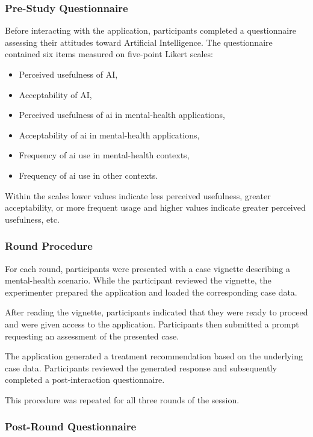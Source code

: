 \documentclass[sigconf,natbib=false]{acmart}
\begin{document}
\subsubsection{Pre-Study Questionnaire}

Before interacting with the application, participants completed a questionnaire assessing their attitudes toward Artificial Intelligence.
The questionnaire contained six items measured on five-point Likert scales:

\begin{itemize}
\item Perceived usefulness of AI,
\item Acceptability of AI,
\item Perceived usefulness of \Gls{ai} in mental-health applications,
\item Acceptability of \Gls{ai} in mental-health applications,
\item Frequency of \Gls{ai} use in mental-health contexts,
\item Frequency of \Gls{ai} use in other contexts.
\end{itemize}

Within the scales lower values indicate less perceived usefulness, greater acceptability, or more frequent usage and higher values indicate greater perceived usefulness, etc.

\subsubsection{Round Procedure}

For each round, participants were presented with a case vignette describing a mental-health scenario.
While the participant reviewed the vignette, the experimenter prepared the application and loaded the corresponding case data.


After reading the vignette, participants indicated that they were ready to proceed and were given access to the application.
Participants then submitted a prompt requesting an assessment of the presented case.

The application generated a treatment recommendation based on the underlying case data.
Participants reviewed the generated response and subsequently completed a post-interaction questionnaire.

This procedure was repeated for all three rounds of the session.

\subsubsection{Post-Round Questionnaire}
\end{document}
